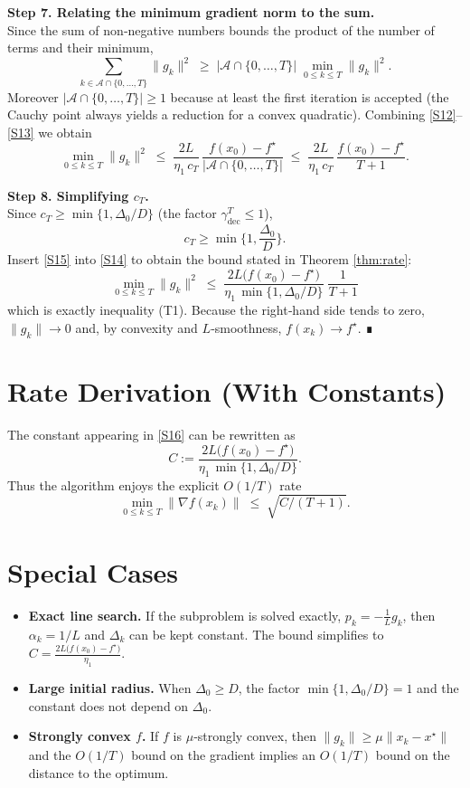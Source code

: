\documentclass{article}
\begin{document}
\noindent\textbf{Step 7.  Relating the minimum gradient norm to the sum.}\\
Since the sum of non‑negative numbers bounds the product of the number of
terms and their minimum,
\[
\sum_{k\in\mathcal{A}\cap\{0,\dots,T\}}\|g_k\|^{2}
\;\ge\;
|\mathcal{A}\cap\{0,\dots,T\}|\;
\min_{0\le k\le T}\|g_k\|^{2}.
\tag{S13}
\]
Moreover $|\mathcal{A}\cap\{0,\dots,T\}|\ge 1$ because at least the first
iteration is accepted (the Cauchy point always yields a reduction for a convex
quadratic).  Combining \eqref{S12}–\eqref{S13} we obtain
\[
\min_{0\le k\le T}\|g_k\|^{2}
\;\le\;
\frac{2L}{\eta_1\,c_T}\,
\frac{f(x_0)-f^{\star}}{|\mathcal{A}\cap\{0,\dots,T\}|}
\;\le\;
\frac{2L}{\eta_1\,c_T}\,
\frac{f(x_0)-f^{\star}}{T+1}.
\tag{S14}
\]

\noindent\textbf{Step 8.  Simplifying $c_T$.}\\
Since $c_T\ge\min\{1,\Delta_0/D\}$ (the factor $\gamma_{\text{dec}}^{T}\le1$),
\[
c_T\ge \min\Big\{1,\frac{\Delta_0}{D}\Big\}.
\tag{S15}
\]
Insert \eqref{S15} into \eqref{S14} to obtain the bound stated in
Theorem \ref{thm:rate}:
\[
\boxed{
\displaystyle
\min_{0\le k\le T}\|g_k\|^{2}
\;\le\;
\frac{2L\bigl(f(x_0)-f^{\star}\bigr)}
{\eta_1\,\min\{1,\Delta_0/D\}}\;
\frac{1}{T+1}
}
\tag{S16}
\]
which is exactly inequality (T1).  Because the right‑hand side tends to zero,
$\|g_k\|\to0$ and, by convexity and $L$‑smoothness, $f(x_k)\to f^{\star}$.
∎

\section*{Rate Derivation (With Constants)}
The constant appearing in \eqref{S16} can be rewritten as
\[
C:=\frac{2L\bigl(f(x_0)-f^{\star}\bigr)}
{\eta_1\,\min\{1,\Delta_0/D\}}.
\]
Thus the algorithm enjoys the explicit $O(1/T)$ rate
\[
\min_{0\le k\le T}\| \nabla f(x_k)\| \;\le\; \sqrt{C/(T+1)} .
\]

\section*{Special Cases}
\begin{itemize}
\item \textbf{Exact line search.}  If the subproblem is solved exactly,
$p_k = -\frac{1}{L}g_k$, then $\alpha_k=1/L$ and $\Delta_k$ can be kept
constant.  The bound simplifies to $C = \frac{2L\bigl(f(x_0)-f^{\star}\bigr)}{\eta_1}$.
\item \textbf{Large initial radius.}  When $\Delta_0\ge D$, the factor
$\min\{1,\Delta_0/D\}=1$ and the constant does not depend on $\Delta_0$.
\item \textbf{Strongly convex $f$.}  If $f$ is $\mu$‑strongly convex,
then $\|g_k\|\ge\mu\|x_k-x^{\star}\|$ and the $O(1/T)$ bound on the gradient
implies an $O(1/T)$ bound on the distance to the optimum.
\end{itemize}
\end{document}
